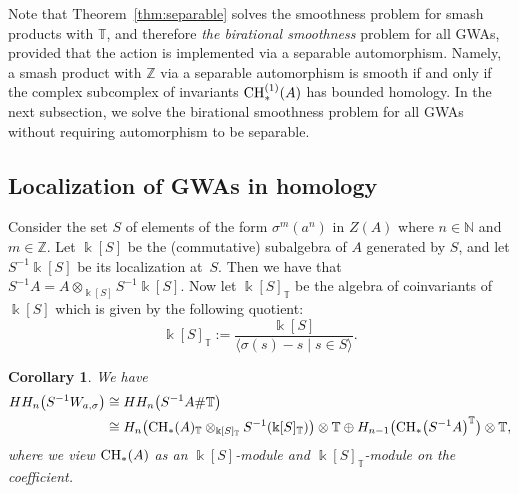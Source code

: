 \documentclass[pdftex]{sigma}
\newcommand{\B}[1]{\mathbb{#1}}
\newcommand{\CH}{{\rm CH}}
\numberwithin{equation}{section}
\newtheorem{Corollary}[Theorem]{Corollary}
\begin{document}
Note that Theorem~\ref{thm:separable} solves the smoothness problem for smash products with
$\B{T}$, and therefore \emph{the birational smoothness} problem for all GWAs, provided that
the action is implemented via a separable automorphism. Namely, a smash product with
$\B{Z}$ via a separable automorphism is smooth if and only if the complex subcomplex of
invariants $\CH_*^{(1)}(A)$ has bounded homology. In the next subsection, we solve the
birational smoothness problem for all GWAs without requiring automorphism to be separable.

\subsection{Localization of GWAs in homology}\label{sect:localizationGWA}

Consider the set $S$ of elements of the form $\sigma^m(a^n)$ in $Z(A)$ where $n\in\B{N}$ and
$m\in\B{Z}$. Let $\Bbbk[ S]$ be the (commutative) subalgebra of $A$ generated by $S$,
and let $S^{-1}\Bbbk[ S]$ be its localization at~$S$. Then we have that
$S^{-1}A=A\otimes_{\Bbbk[ S]}S^{-1}\Bbbk[ S]$. Now let
$\Bbbk[ S]_{\B{T}}$ be the algebra of coinvariants of~$\Bbbk[ S]$ which is
given by the following quotient:
\[ \Bbbk[ S]_{\B{T}} := \frac{\Bbbk[ S]}{\langle \sigma(s)-s\mid
 s\in S\rangle}. \]

\begin{Corollary} \label{cor:localization}
 We have
 \begin{align*}
 HH_n\bigl(S^{-1}W_{a,\sigma}\bigr)
 \cong{} & HH_n\bigl(S^{-1}A\# \B{T}\bigr)\\
 \cong{} & H_n\bigl(\CH_*(A)_{\B{T}}\otimes_{\Bbbk[ S]_{\B{T}}}S^{-1}(\Bbbk[ S]_{\B{T}})\bigr) \otimes \B{T}
 \oplus H_{n-1}\bigl(\CH_*\bigl(S^{-1}A\bigr)^{\B{T}}\bigr)\otimes \B{T},
 \end{align*}
 where we view $\CH_*(A)$ as an $\Bbbk[ S]$-module and $\Bbbk[ S]_{\B{T}}$-module on the
 coefficient.
\end{Corollary}
\end{document}
